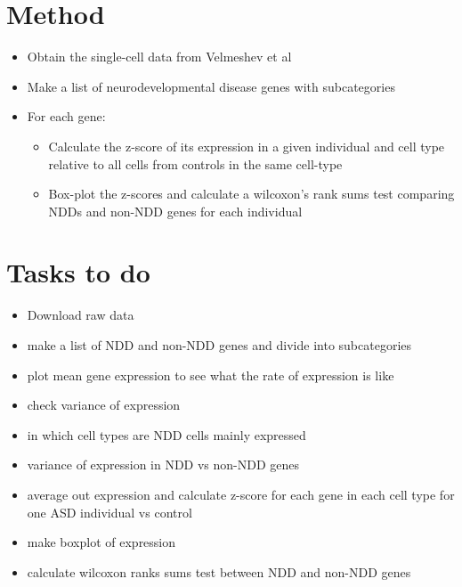 \documentclass[12pt]{article}
\begin{document}
\section{Method}
\begin{itemize}
    \item Obtain the single-cell data from Velmeshev et al 
    \item Make a list of neurodevelopmental disease genes with subcategories 
    \item For each gene: 
    \begin{itemize}
        \item Calculate the z-score of its expression in a given individual and cell type relative to all cells from controls in the same cell-type 
        \item Box-plot the z-scores and calculate a wilcoxon's rank sums test comparing NDDs and non-NDD genes for each individual
    \end{itemize}
\end{itemize}
 

\section{Tasks to do}
\begin{itemize}
    \item Download raw data
    \item make a list of NDD and non-NDD genes and divide into subcategories 
    \item plot mean gene expression to see what the rate of expression is like 
    \item check variance of expression
    \item in which cell types are NDD cells mainly expressed 
    \item variance of expression in NDD vs non-NDD genes 
    \item average out expression and calculate z-score for each gene in each cell type for one ASD individual vs control 
    \item make boxplot of expression
    \item calculate wilcoxon ranks sums test between NDD and non-NDD genes 
\end{itemize}
\end{document}
